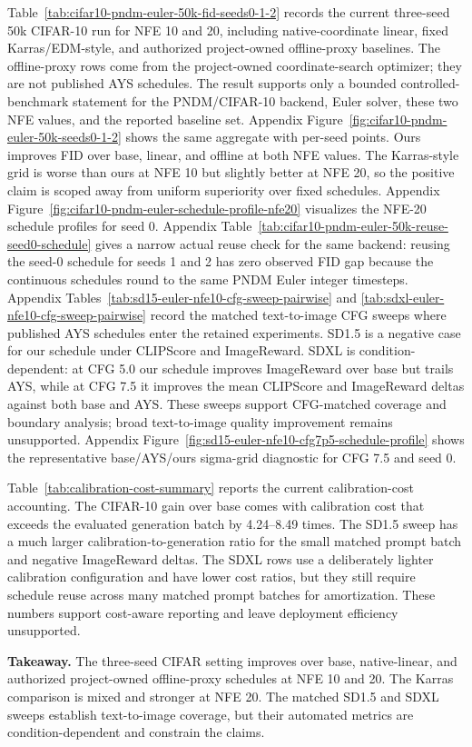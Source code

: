 Table~\ref{tab:cifar10-pndm-euler-50k-fid-seeds0-1-2} records the current
three-seed 50k CIFAR-10 run for NFE 10 and 20, including native-coordinate
linear, fixed Karras/EDM-style, and authorized project-owned offline-proxy
baselines. The offline-proxy rows come from the project-owned coordinate-search optimizer; they
are not published AYS schedules. The result supports only a bounded
controlled-benchmark statement
for the PNDM/CIFAR-10 backend, Euler solver, these two NFE values, and the
reported baseline set. Appendix
Figure~\ref{fig:cifar10-pndm-euler-50k-seeds0-1-2} shows the same aggregate
with per-seed points. Ours improves FID over base, linear, and offline at
both NFE values. The Karras-style grid is worse than ours at NFE 10 but
slightly better at NFE 20, so the positive claim is scoped away from uniform
superiority over fixed schedules. Appendix
Figure~\ref{fig:cifar10-pndm-euler-schedule-profile-nfe20} visualizes the
NFE-20 schedule profiles for seed 0. Appendix
Table~\ref{tab:cifar10-pndm-euler-50k-reuse-seed0-schedule} gives a narrow
actual reuse check for the same backend: reusing the seed-0 schedule
for seeds 1 and 2 has zero observed FID gap because the continuous schedules
round to the same PNDM Euler integer timesteps. Appendix
Tables~\ref{tab:sd15-euler-nfe10-cfg-sweep-pairwise} and
\ref{tab:sdxl-euler-nfe10-cfg-sweep-pairwise} record the matched
text-to-image CFG sweeps where published AYS schedules enter the retained
experiments. SD1.5 is a negative case for our schedule under CLIPScore and
ImageReward. SDXL is condition-dependent: at CFG 5.0 our schedule improves
ImageReward over base but trails AYS, while at CFG 7.5 it improves the mean
CLIPScore and ImageReward deltas against both base and AYS. These sweeps
support CFG-matched coverage and boundary analysis; broad text-to-image
quality improvement remains unsupported. Appendix
Figure~\ref{fig:sd15-euler-nfe10-cfg7p5-schedule-profile} shows the
representative base/AYS/ours sigma-grid diagnostic for CFG 7.5 and seed 0.



Table~\ref{tab:calibration-cost-summary} reports the current calibration-cost
accounting. The CIFAR-10 gain over base comes with calibration cost that exceeds
the evaluated generation batch by 4.24--8.49 times. The SD1.5 sweep has a much
larger calibration-to-generation ratio for the small matched prompt batch and
negative ImageReward deltas. The SDXL rows use a deliberately lighter
calibration configuration and have lower cost ratios, but they still require
schedule reuse across many matched prompt batches for amortization. These
numbers support cost-aware reporting and leave deployment efficiency
unsupported.

\textbf{Takeaway.} The three-seed CIFAR setting improves over base,
native-linear, and authorized project-owned offline-proxy schedules at NFE 10
and 20. The Karras comparison is mixed and stronger at NFE 20. The matched
SD1.5 and SDXL sweeps establish text-to-image coverage, but their automated
metrics are condition-dependent and constrain the claims.
